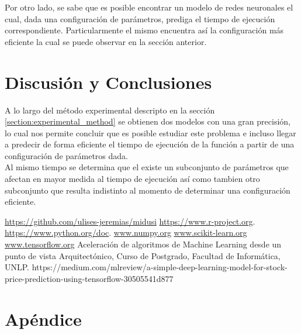 \documentclass[osajnl,twocolumn,showpacs,superscriptaddress,10pt]{revtex4-1} %
\begin{document}
Por otro lado, se sabe que es posible encontrar un modelo de redes neuronales el cual, dada una configuración de parámetros, prediga el tiempo de ejecución correspondiente. Particularmente el mismo encuentra así la configuración más eficiente la cual se puede observar en la sección anterior. \\

\section{Discusión y Conclusiones}

A lo largo del método experimental descripto en la sección \ref{section:experimental_method} se obtienen dos modelos con una gran precisión, lo cual nos permite concluir que es posible estudiar este problema e incluso llegar a predecir de forma eficiente el tiempo de ejecución de la función a partir de una configuración de parámetros dada. \\

Al mismo tiempo se determina que el existe un subconjunto de parámetros que afectan en mayor medida al tiempo de ejecución así como tambien otro subconjunto que resulta indistinto al momento de determinar una configuración eficiente. \\

\begin{thebibliography}{99}

 \url{https://github.com/ulises-jeremias/midusi}
 \url{https://www.r-project.org}.
 \url{https://www.python.org/doc}.
 \url{www.numpy.org}
 \url{www.scikit-learn.org}
 \url{www.tensorflow.org}
 Aceleración de algoritmos de Machine Learning desde un punto de vista Arquitectónico, Curso de Postgrado, Facultad de Informática, UNLP.
 https://medium.com/mlreview/a-simple-deep-learning-model-for-stock-price-prediction-using-tensorflow-30505541d877

\end{thebibliography}

\clearpage

\onecolumngrid

\section{Apéndice}
\end{document}
